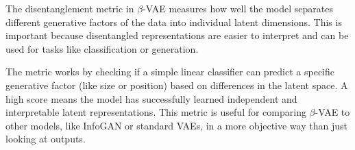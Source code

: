 \begin{qsolve}
    \begin{qsolve}[]
      The disentanglement metric in \(\beta\)-VAE measures how well the model separates different generative factors of the data into individual latent dimensions. This is important because disentangled representations are easier to interpret and can be used for tasks like classification or generation.

      The metric works by checking if a simple linear classifier can predict a specific generative factor (like size or position) based on differences in the latent space. A high score means the model has successfully learned independent and interpretable latent representations. This metric is useful for comparing \(\beta\)-VAE to other models, like InfoGAN or standard VAEs, in a more objective way than just looking at outputs.
    \end{qsolve}
\end{qsolve}


